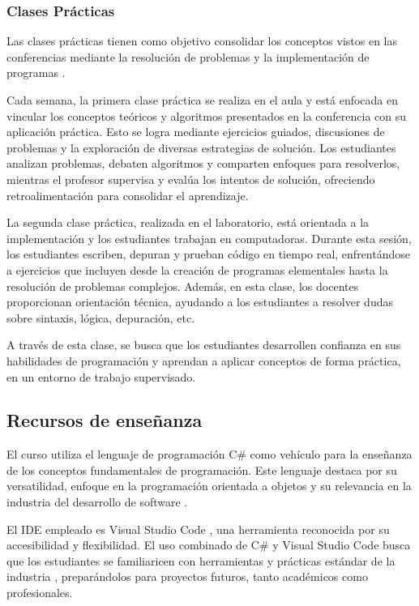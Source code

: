 \documentclass{article}
\begin{document}
\subsubsection{Clases Prácticas}
Las clases prácticas tienen como objetivo consolidar los conceptos vistos en las conferencias mediante la resolución de problemas y la implementación de programas .

Cada semana, la primera clase práctica se realiza en el aula y está enfocada en vincular los conceptos teóricos y algoritmos presentados en la conferencia con su aplicación práctica. Esto se logra mediante ejercicios guiados, discusiones de problemas y la exploración de diversas estrategias de solución. Los estudiantes analizan problemas, debaten algoritmos y comparten enfoques para resolverlos, mientras el profesor supervisa y evalúa los intentos de solución, ofreciendo retroalimentación para consolidar el aprendizaje.

La segunda clase práctica, realizada en el laboratorio, está orientada a la implementación y los estudiantes trabajan en computadoras. Durante esta sesión, los estudiantes escriben, depuran y prueban código en tiempo real, enfrentándose a ejercicios que incluyen desde la creación de programas elementales hasta la resolución de problemas complejos. Además, en esta clase, los docentes proporcionan orientación técnica, ayudando a los estudiantes a resolver dudas sobre sintaxis, lógica, depuración, etc. 

A través de esta clase, se busca que los estudiantes desarrollen confianza en sus habilidades de programación y aprendan a aplicar conceptos de forma práctica, en un entorno de trabajo supervisado.\\


\subsection{Recursos de enseñanza}

El curso utiliza el lenguaje de programación C\# como vehículo para la enseñanza de los conceptos fundamentales de programación. Este lenguaje destaca por su versatilidad, enfoque en la programación orientada a objetos y su relevancia en la industria del desarrollo de software .

El IDE empleado es Visual Studio Code \agregaesto{[REF]}, una herramienta reconocida por su accesibilidad y flexibilidad. El uso combinado de C\# y Visual Studio Code busca que los estudiantes se familiaricen con herramientas y prácticas estándar de la industria \agregaesto{[REF]}, preparándolos para proyectos futuros, tanto académicos como profesionales.
\end{document}
